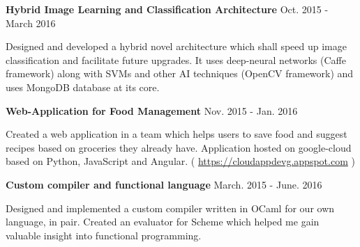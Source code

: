 
\begin{cventries}
	

    \cventry
    {\textbf{Hybrid Image Learning and Classification Architecture}} %
    {}
    {}
    {Oct. 2015 - March 2016} %
    {
    \begin{cvitems} %
    	\item { Designed and developed a hybrid novel architecture which shall speed up image classification and facilitate future upgrades. It uses deep-neural networks (Caffe framework) along with SVMs and other AI techniques (OpenCV framework) and uses MongoDB database at its core. }
    \end{cvitems}
    }


	
	
	\cventry
	{\textbf{Web-Application for Food Management}} %
	{}
    {}
    {Nov. 2015 - Jan. 2016 }
	{
	\begin{cvitems} %
        \item Created a web application in a team which helps users to save food and suggest recipes based on groceries they already have. Application hosted on google-cloud based on Python, JavaScript and Angular. (
    	\url{https://cloudappdevg.appspot.com}
    	)
	\end{cvitems}
	}
	
	
	
	
	\cventry
	{\textbf{Custom compiler and functional language}} %
	{}
    {}
    {March. 2015 - June. 2016}
	{
	\begin{cvitems} %
	    \item Designed and implemented a custom compiler written in OCaml for our own language, in pair. Created an evaluator for Scheme which helped me gain valuable insight into functional programming.
	\end{cvitems}
	}
	

\end{cventries}
